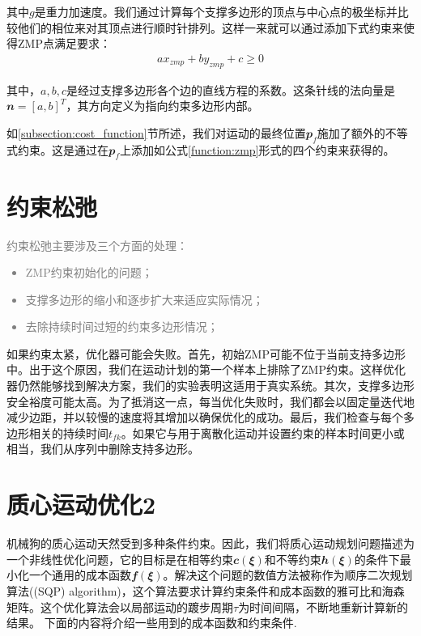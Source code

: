 其中$g$是重力加速度。我们通过计算每个支撑多边形的顶点与中心点的极坐标并比较他们的相位来对其顶点进行顺时针排列。这样一来就可以通过添加下式约束来使得ZMP点满足要求：
\begin{align}
    ax_{zmp}+by_{zmp}+c\geq 0
\end{align}

其中，$a,b,c$是经过支撑多边形各个边的直线方程的系数。这条针线的法向量是$\mathbfit{n}=[a,b]^T$，其方向定义为指向约束多边形内部。

如\ref{subsection:cost_function}节所述，我们对运动的最终位置$\mathbfit{p}_f$施加了额外的不等式约束。这是通过在$\mathbfit{p}_f$上添加如公式\ref{function:zmp}形式的四个约束来获得的。


\section{约束松弛}
\textcolor{gray}{
约束松弛主要涉及三个方面的处理：
\begin{itemize}
    \item ZMP约束初始化的问题；
    \item 支撑多边形的缩小和逐步扩大来适应实际情况；
    \item 去除持续时间过短的约束多边形情况；
\end{itemize}
}

如果约束太紧，优化器可能会失败。首先，初始ZMP可能不位于当前支持多边形中。出于这个原因，我们在运动计划的第一个样本上排除了ZMP约束。这样优化器仍然能够找到解决方案，我们的实验表明这适用于真实系统。其次，支撑多边形安全裕度可能太高。为了抵消这一点，每当优化失败时，我们都会以固定量迭代地减少边距，并以较慢的速度将其增加以确保优化的成功。最后，我们检查与每个多边形相关的持续时间$t_{fk}$。如果它与用于离散化运动并设置约束的样本时间更小或相当，我们从序列中删除支持多边形。

\section{质心运动优化2}

机械狗的质心运动天然受到多种条件约束。因此，我们将质心运动规划问题描述为一个非线性优化问题，它的目标是在相等约束${\mathbfit c}({\mathbfit \xi})$和不等约束${\mathbfit h}({\mathbfit \xi})$的条件下最小化一个通用的成本函数${\mathbfit f}({\mathbfit \xi})$。解决这个问题的数值方法被称作为顺序二次规划算法((SQP) algorithm)，这个算法要求计算约束条件和成本函数的雅可比和海森矩阵。这个优化算法会以局部运动的踱步周期$\tau$为时间间隔，不断地重新计算新的结果。
下面的内容将介绍一些用到的成本函数和约束条件.

